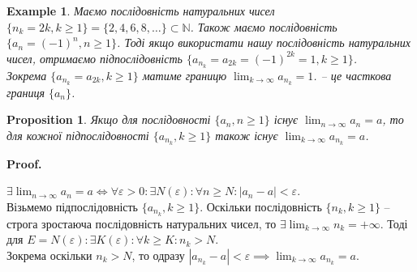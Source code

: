 \documentclass[a4paper, 14pt]{article}
\makeatletter
\def\qed{$\blacksquare$}
\theoremstyle{theoremdd}
\theoremstyle{theoremdd}
\theoremstyle{theoremdd}
\theoremstyle{theoremdd}
\newtheorem{example}[theorem]{Example}
\theoremstyle{theoremdd}
\newtheorem{proposition}[theorem]{Proposition}
\theoremstyle{theoremdd}
\theoremstyle{theoremdd}
\theoremstyle{theoremdd}
\renewenvironment{proof}[1][Proof.\\]{\par
\pushQED{\hfill \qed}%
\normalfont \topsep6\p@\@plus6\p@\relax
\trivlist
\item\relax
{\bfseries
#1\@addpunct{.}}\hspace\labelsep\ignorespaces
}{%
\popQED\endtrivlist\@endpefalse
}
\makeatother
\begin{document}
	\begin{example} Маємо послідовність натуральних чисел
	$\{n_k = 2k, k \geq 1 \} = \{2,4,6,8,\dots \} \subset \mathbb{N}$.
	Також маємо послідовність $\{a_n = (-1)^n, n \geq 1\}$. Тоді якщо використати нашу послідовність натуральних чисел, отримаємо підпослідовність $\{a_{n_k} = a_{2k} = (-1)^{2k} = 1, k \geq 1\}$.\\
	Зокрема $\{a_{n_k} = a_{2k}, k \geq 1\}$ матиме границю $\displaystyle\lim_{k \to \infty} a_{n_k} = 1$. -- це часткова границя $\{a_n\}$.
	\end{example}
	
	\begin{proposition}
	Якщо для послідовності $\{a_n, n \geq 1\}$ існує $\displaystyle \lim_{n \to \infty} a_n = a$, то для кожної підпослідовності $\displaystyle \{a_{n_k}, k \geq 1\}$ також існує $\displaystyle\lim_{k \to \infty} a_{n_k} = a$.
	\end{proposition}
	
	\begin{proof}
	$\displaystyle \exists \lim_{n \to \infty} a_n = a \iff \forall \varepsilon > 0: \exists N(\varepsilon): \forall n \geq N: |a_n-a| < \varepsilon$.\\
	Візьмемо підпослідовність $\{a_{n_k}, k \geq 1\}$. Оскільки послідовність $\{n_k, k \geq 1\}$ -- строга зростаюча послідовність натуральних чисел, то $\exists \displaystyle \lim_{k \to \infty} n_k = +\infty$. Тоді для $E = N(\varepsilon): \exists K(\varepsilon): \forall k \geq K: n_k > N$.\\
	Зокрема оскільки $n_k > N$, то одразу $|a_{n_k} - a| < \varepsilon \implies \displaystyle \lim_{k \to \infty} a_{n_k} = a$.
	\end{proof}
	
	\iffalse %
	\begin{proposition}
	Якщо для кожної підпослідовності $\{a_{n_k}, k \geq 1\}: \exists \displaystyle\lim_{k \to \infty} a_{n_k} = a$, то для послідовності $\{a_n, n \geq 1\}: \exists \displaystyle\lim_{n \to \infty} a_n = a0$.\\
	\textit{Вказівка: зауважити, що $\{a_n, n \geq 1\}$ - це в якомусь сенсі підпослідовність $\{a_{n_k}, k \geq 1\}$, якщо $n_k = k$.}
	\end{proposition}
	\fi
	
	\iffalse %
	\begin{proof}
	!Припустимо, що $\displaystyle\lim_{n \to \infty} a_n \neq a$, тобто $\exists \varepsilon^* > 0: \forall N: \exists n \geq N: |a_n-a| \geq \varepsilon^*$\\
	При $N = 1$ маємо, що $\exists n = n_1 \geq 1: |a_{n_1} - a| \geq \varepsilon^*$\\
	При $N = n_1$ маємо, що $\exists n = n_2 > n_1: |a_{n_2} - a| \geq \varepsilon^*$\\
	$\vdots$\\
	При $N = n_k$ маємо, що $\exists n = n_k > \dots > n_2 > n_1: |a_{n_k} - a| \geq \varepsilon^*$\\
	Тобто $\forall k \geq 1: |a_{n_k} - a| \geq \varepsilon^*$. А це означає, що $\displaystyle\lim_{k \to \infty} a_{n_k} \neq a$ для побудованої підпослідовності. Суперечність!
	\end{proof}
	\fi
	
\end{document}
